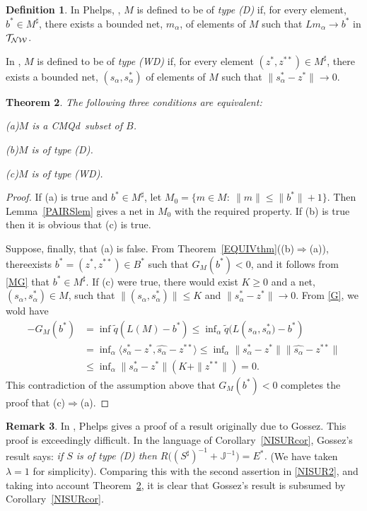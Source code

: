 \documentclass[letterpaper]{article}
\theoremstyle{plain}
\newtheorem{theorem}{Theorem}[section]
\theoremstyle{definition}
\newtheorem{definition}[theorem]{Definition}
\newtheorem{remark}[theorem]{Remark}
\numberwithin{equation}{section}
\newcommand{\bra}[2]{\langle#1,#2\rangle}
\newcommand{\cmqd}{{CMQd}}
\newcommand{\dbs}{^{**}}
\newcommand{\infn}{\inf\nolimits}
\newcommand{\J}{{\mathbb J}}
\newcommand{\lr}{\Longrightarrow}
\newcommand{\qt}{\wt q}
\newcommand{\TNW}{\cal{T_{NW}}}
\newcommand{\wh}{\widehat}
\newcommand{\wt}{\widetilde}
\newcommand{\Cor}{Corollary~\ref}
\newcommand{\Def}{Definition~\ref}
\newcommand{\Lem}{Lemma~\ref}
\newcommand{\Rem}{Remark~\ref}
\newcommand{\Thm}{Theorem~\ref}
\begin{document}
%
\begin{definition}\label{Ddef}
In Phelps, \cite[Definition 3.1, pp.\ 216-217]{PRAGUE}, $M$ is defined to be of {\em type (D)} if, for every element, $b^* \in M^\sharp$, there exists a bounded net, $m_\alpha$, of elements of $M$ such that $Lm_\alpha \to b^*$ in $\TNW$.
\par
In \cite[Definition 14, p.\ 187]{RANGE}, $M$ is defined to be of {\em type (WD)} if, for every element $(z^*,z\dbs) \in M^\sharp$, there exists a bounded net, $(s_\alpha,s^*_\alpha)$ of elements of $M$ such that $\|s^*_\alpha - z^*\| \to 0$.

\end{definition} 
\begin{theorem}\label{Dthm}
The following three conditions are equivalent:
\par\noindent
{\rm(a)}\enspace $M$ is a \cmqd\ subset of $B$.
\par\noindent
{\rm(b)}\enspace $M$ is of type (D).
\par\noindent
{\rm(c)}\enspace $M$ is of type (WD).
\end{theorem}
%
\begin{proof}
If (a) is true and $b^* \in M^\sharp$, let $M_0 = \{m \in M\colon\ \|m\|\le \|b^*\| + 1\}$.   Then \Lem{PAIRSlem} gives a net in $M_0$ with the required property.   If (b) is true then it is obvious that (c) is true.
\par
Suppose, finally, that (a) is false.   From \Thm{EQUIVthm}\big((b)$\lr$(a)\big), there\break exists $b^* = (z^*,z\dbs) \in B^*$ such that $G_M(b^*) < 0$, and it follows from \eqref{MG} that $b^* \in M^\sharp$.   If (c) were true, there would exist $K \ge 0$ and a net, $(s_\alpha,s^*_\alpha) \in M$, such that $\|(s_\alpha,s^*_\alpha)\| \le K$ and $\|s^*_\alpha - z^*\| \to 0$.   From \eqref{G}, we wold have 
%
\begin{align*}
-G_M(b^*) &= \inf\qt(L(M) - b^*) \le \infn_\alpha\qt\big(L(s_\alpha,s^*_\alpha\big) - b^*)\\
&= \infn_\alpha\bra{s_\alpha^* - z^*}{\wh{s_\alpha} - z\dbs} \le \infn_\alpha\|s_\alpha^* - z^*\|\|\wh{s_\alpha} - z\dbs\|\\
&\le \infn_\alpha\|s_\alpha^* - z^*\|(K + \|z\dbs\|) = 0.
\end{align*}
%
This contradiction of the assumption above that $G_M(b^*) < 0$ completes the proof that (c)$\lr$(a).      
\end{proof}
\begin{remark}\label{SURrem}
In \cite[Theorems 3.5 and 3.6, pp.\ 218--221]{PRAGUE}, Phelps gives a proof of a result originally due to Gossez.   This proof is exceedingly difficult.     In the language of \Cor{NISURcor}, Gossez's result says:  {\em if $S$ is of type (D) then
$R\big((S^\sharp)^{-1} + {\J}^{-1}\big) = E^*$.}  (We have taken $\lambda = 1$ for simplicity).   Comparing this with the second assertion in \eqref{NISUR2}, and taking into account \Thm{Dthm}, it is clear that Gossez's result is subsumed by \Cor{NISURcor}.   
\end{remark}
\end{document}
